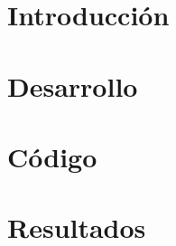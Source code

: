 \documentclass[12pt, openany]{article}
\theoremstyle{definition}
\numberwithin{equation}{section}
\renewcommand{\listtablename}{Lista de tablas}%
\renewcommand{\listfigurename}{Lista de figuras}%
\begin{document}
\onehalfspacing


\clearpage

\doublespacing	
\tableofcontents
\pagestyle{plain}
\clearpage

%

\pagestyle{fancy}
\setcounter{page}{1}	
\onehalfspacing		
\section{Introducción}
	\label{chap:intro}
	
\clearpage
	
\section{Desarrollo}
	\label{chap:1}
	
\clearpage

\section{Código}
	\label{chap:2}
	
\clearpage

\section{Resultados}
	\label{chap:resultados}
	
\end{document}
